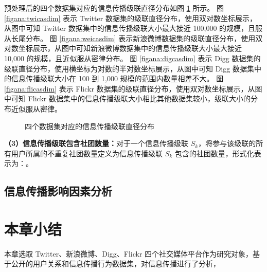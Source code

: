预处理后的四个数据集对应的信息传播级联直径分布如图 \ref{figana:casdim} 所示。
图 \ref{figana:twicasdim} 表示 Twitter 数据集的级联直径分布，使用双对数坐标展示，从图中可知 Twitter 数据集中的信息传播级联大小最大接近 100,000 的规模，且服从长尾分布。
图 \ref{figana:weicasdim} 表示新浪微博数据集的级联直径分布，使用双对数坐标展示，从图中可知新浪微博数据集中的信息传播级联大小最大接近 10,000 的规模，且近似服从密律分布。
图 \ref{figana:digcasdim} 表示 Digg 数据集的级联直径分布，使用横坐标为对数的半对数坐标展示，从图中可知 Digg 数据集中的信息传播级联大小在 100 到 1,000 规模的范围内数量相差不大。
图 \ref{figana:flicasdim} 表示 Flickr 数据集的级联直径分布，使用双对数坐标展示，从图中可知 Flickr 数据集中的信息传播级联大小相比其他数据集较小，级联大小的分布近似服从密律。


\begin{figure}
	\centering

    \caption{四个数据集对应的信息传播级联直径分布}
    \label{figana:casdim}
\end{figure}





\textbf{（3）信息传播级联包含社团数量：}对于一个信息传播级联 $S_{k}$，将参与该级联的所有用户所属的不重复社团数量定义为信息传播级联 $S_{k}$ 包含的社团数量，形式化表示为：。


\subsection{信息传播影响因素分析}


\section{本章小结}
本章选取 Twitter、新浪微博、Digg、Flickr 四个社交媒体平台作为研究对象，基于公开的用户关系和信息传播行为数据集，对信息传播进行了分析，
